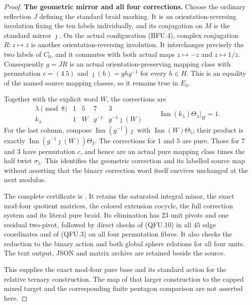 \begin{proof}
\par\medskip\noindent\textbf{The geometric mirror and all four corrections.}\quad
Choose the ordinary reflection $J$ defining the standard
braid marking.  It is an orientation-reversing involution
fixing the ten labels individually, and its conjugation on
$M$ is the standard mirror $\jmath$.
On the actual configuration (BFU.4), complex conjugation
$R:z\mapsto\overline z$ is another orientation-reversing
involution.  It interchanges precisely the two labels
of $C_0$, and it commutes with both actual maps
$z\mapsto-z$ and $z\mapsto1/z$.
Consequently $g=JR$ is an actual orientation-preserving
mapping class with permutation $c=(4\ 5)$ and
$\jmath(h)=ghg^{-1}$ for every $h\in H$.
This is an equality of the named source mapping classes,
so it remains true in $E_4$.

Together with the explicit word $W$, the corrections are
\[
\begin{array}{c|cccc}
 \lambda\pmod8&1&5&7&3\\ \hline
 k_\lambda&1&W&g^{-1}&g^{-1}\jmath(W)
\end{array}
\qquad
 \operatorname{Inn}(k_\lambda)\Theta_\lambda
                       \big|_H=1.
                                                               \tag{QFU.11}
\]
For the last column, compose
$\operatorname{Inn}(g^{-1})\jmath$ with
$\operatorname{Inn}(W)\Theta_5$; their product is exactly
$\operatorname{Inn}(g^{-1}\jmath(W))\Theta_3$.
The corrections for $1$ and $5$ are pure.  Those for $7$
and $3$ have permutation $c$, and hence are an actual
pure mapping class times the half twist $\sigma_5$.
This identifies the geometric correction and its labelled
source map without asserting that the binary correction
word itself survives unchanged at the next modulus.

The complete certificate is
.
It retains the saturated integral minor, the exact
mod-four quotient matrices, the colored extension cocycle,
the full correction system and its literal pure braid.
Its elimination has $23$ unit pivots and one residual
two-pivot, followed by direct checks of (QFU.10) in all
$45$ edge coordinates and of (QFU.3) on all four
permutation fibres.  It also checks the reduction to the
binary action and both global sphere relations for all
four units.  The text output, JSON and matrix archive are
retained beside the source.

This supplies the exact mod-four pure base and its standard
action for the relative ternary construction.  The map of
that larger construction to the capped mixed target and
the corresponding finite pentagon comparison are not
asserted here.
\end{proof}
